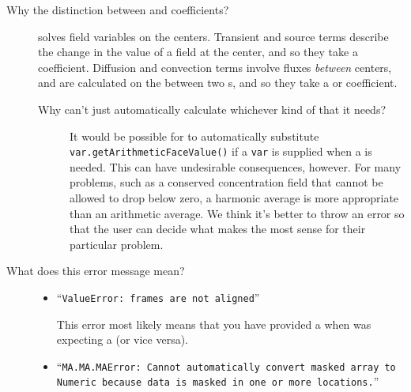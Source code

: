 \begin{description}
\begin{description}
\begin{quote}
            \end{quote}

        \end{description}
        
    \item[Why the distinction between \Class{CellVariable} and
    \Class{FaceVariable} coefficients?]  \FiPy{} solves field
    variables on the  centers.  Transient and source terms
    describe the change in the value of a field at the 
    center, and so they take a  coefficient.
    Diffusion and convection terms involve fluxes \emph{between}
     centers, and are calculated on the 
    between two s, and so they take a 
    or  coefficient.
    
        \begin{description}
            \item [Why can't \FiPy{} just automatically calculate
            whichever kind of  that it needs?]  It
            would be possible for \FiPy{} to automatically substitute
            \verb+var.getArithmeticFaceValue()+ if a
             \verb+var+ is supplied when a
             is needed.  This can have undesirable
            consequences, however.  For many problems, such as a
            conserved concentration field that cannot be allowed to
            drop below zero, a harmonic average is more appropriate
            than an arithmetic average.  We think it's better to throw
            an error so that the \FiPy{} user can decide what makes
            the most sense for their particular problem.
        \end{description}
        
    \item[What does this error message mean?]\hspace*{\fill}
    
        \begin{itemize}
            
            \item ``\texttt{ValueError: frames are not aligned}''
            
            This error most likely means that you have provided a
             when \FiPy{} was expecting a
             (or vice versa).

            \item ``\texttt{MA.MA.MAError: Cannot automatically
            convert masked array to Numeric because data is masked in one or
            more locations.}''
            

\end{itemize}
\end{description}
